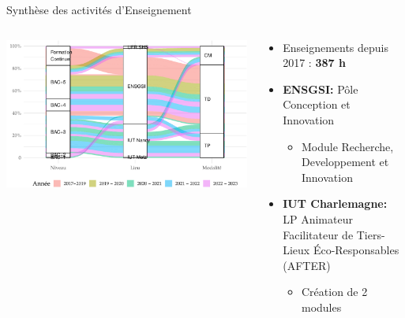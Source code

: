 \documentclass[
  11pt,
  ignorenonframetext,
  aspectratio=169,
  c]{beamer}
\providecommand{\tightlist}{%
  \setlength{\itemsep}{0pt}\setlength{\parskip}{0pt}}\usepackage{longtable,booktabs,array}
\begin{document}
\begin{frame}{Synthèse des activités d'Enseignement}
\protect\hypertarget{synthuxe8se-des-activituxe9s-denseignement}{}
\begin{columns}[T]
\begin{column}[c]{0.5\textwidth}
\includegraphics{figures/fig-sankey-1.pdf}
\end{column}

\begin{column}[c]{0.5\textwidth}
\small

\begin{itemize}
\item
  Enseignements depuis 2017 : \textbf{387 h}
\item
  \textbf{ENSGSI:} Pôle Conception et Innovation

  \begin{itemize}
  \tightlist
  \item
    Module Recherche, Developpement et Innovation
  \end{itemize}
\item
  \textbf{IUT Charlemagne:} LP Animateur Facilitateur de Tiers-Lieux
  Éco-Responsables (AFTER)

  \begin{itemize}
  \tightlist
  \item
    Création de 2 modules
  \end{itemize}
\end{itemize}
\end{column}
\end{columns}
\end{frame}
\end{document}
